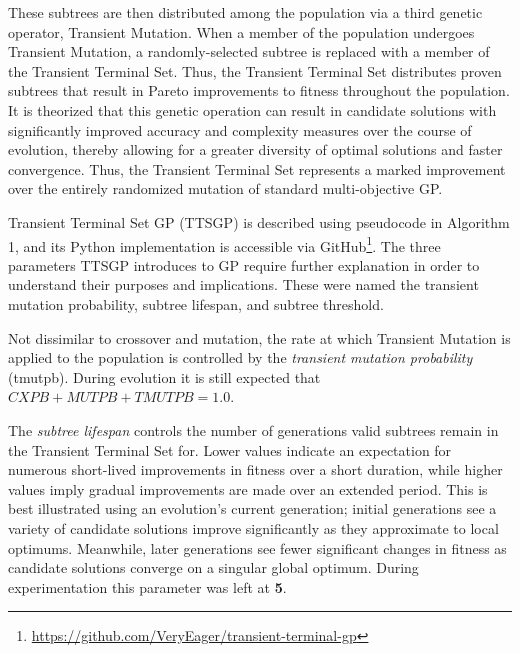 \documentclass[a4paper, twocolumn]{article}
\begin{document}
These subtrees are then distributed among the population via a third genetic operator, Transient Mutation. When a member of the population undergoes Transient Mutation, a randomly-selected subtree is replaced with a member of the Transient Terminal Set. Thus, the Transient Terminal Set distributes proven subtrees that result in Pareto improvements to fitness throughout the population. It is theorized that this genetic operation can result in candidate solutions with significantly improved accuracy and complexity measures over the course of evolution, thereby allowing for a greater diversity of optimal solutions and faster convergence. Thus, the Transient Terminal Set represents a marked improvement over the entirely randomized mutation of standard multi-objective GP. 

Transient Terminal Set GP (TTSGP) is described using pseudocode in Algorithm 1, and its Python implementation is accessible via GitHub\footnote[1]{\url{https://github.com/VeryEager/transient-terminal-gp}}. The three parameters TTSGP introduces to GP require further explanation in order to understand their purposes and implications. These were named the transient mutation probability, subtree lifespan, and subtree threshold.

Not dissimilar to crossover and mutation, the rate at which Transient Mutation is applied to the population is controlled by the \textit{transient mutation probability} (tmutpb). During evolution it is still expected that $CXPB + MUTPB + TMUTPB = 1.0$.

The \textit{subtree lifespan} controls the number of generations valid subtrees remain in the Transient Terminal Set for. Lower values indicate an expectation for numerous short-lived improvements in fitness over a short duration, while higher values imply gradual improvements are made over an extended period. This is best illustrated using an evolution's current generation; initial generations see a variety of candidate solutions improve significantly as they approximate to local optimums. Meanwhile, later generations see fewer significant changes in fitness as candidate solutions converge on a singular global optimum. During experimentation this parameter was left at \textbf{5}.
\end{document}

